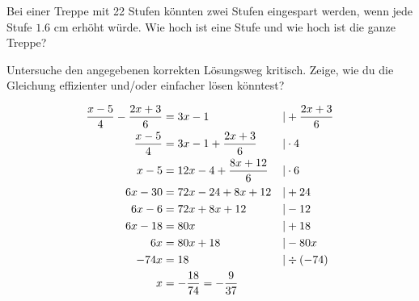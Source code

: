 \documentclass[11pt]{exam}
\begin{document}
\begin{questions}
\question[5] %
Bei einer Treppe mit 22 Stufen könnten zwei Stufen eingespart werden, wenn jede Stufe $1.6$ cm erhöht würde.
Wie hoch ist eine Stufe und wie hoch ist die ganze Treppe?

\question[4] %
Untersuche den angegebenen korrekten Lösungsweg kritisch. Zeige, wie du die Gleichung effizienter und/oder einfacher lösen könntest?
\begin{small}
    \begin{align*}
        \frac{x-5}{4}-\frac{2x+3}{6} &= 3x-1 &&\vert+\frac{2x+3}{6}\\
        \frac{x-5}{4} &= 3x-1+\frac{2x+3}{6} &&\vert\cdot4 \\
        x-5 &= 12x-4+\frac{8x+12}{6} &&\vert\cdot6 \\
        6x-30 &= 72x-24+8x+12 &&\vert+24 \\
        6x-6 &= 72x+8x+12 &&\vert -12 \\
        6x-18 &= 80x &&\vert +18 \\
        6x &= 80x+18 &&\vert -80x \\
        -74x &= 18 &&\vert \div(-74) \\
        x &= -\frac{18}{74}=-\frac{9}{37}
    \end{align*}
\end{small}

\question[5]

\question[5]



\end{questions}
\end{document}
